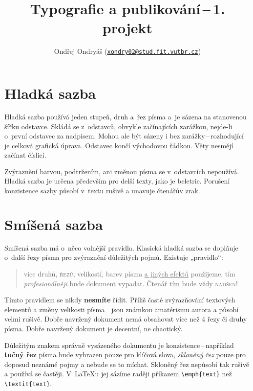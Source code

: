 \documentclass[twocolumn,10pt]{article}
\title{Typografie a publikování\,--\,1. projekt\vspace{.4em}}
\author{Ondřej Ondryáš (\href{mailto:xondry02@stud.fit.vutbr.cz}{\nolinkurl{xondry02@stud.fit.vutbr.cz}})}
\date{}
\begin{document}
\maketitle

\section{Hladká sazba}

Hladká sazba používá jeden stupeň, druh a~řez písma a~je sázena na stanovenou šířku odstavce. Skládá se z~odstavců, obvykle začínajících zarážkou, nejde-li o~první odstavec za nadpisem. Mohou ale být sázeny i bez zarážky\,--\,rozhodující je celková grafická úprava. Odstavec končí východovou řádkou. Věty nesmějí začínat číslicí.

Zvýraznění barvou, podtržením, ani změnou písma se v~odstavcích nepoužívá. Hladká sazba je určena především pro delší texty, jako je beletrie. Porušení konzistence sazby působí v~textu rušivě a unavuje čtenářův zrak.

\section{Smíšená sazba}

Smíšená sazba má o~něco volnější pravidla. Klasická hladká sazba se doplňuje o~další řezy písma pro zvýraznění důležitých pojmů. Existuje „pravidlo“:

\begin{quotation}
{ více druhů}, \textsc{řezů}, {\tiny velikostí}, barev písma \underline{a jiných efektů} použijeme, tím \emph{\large profesionálněji} bude dokument vypadat. Čtenář tím bude vždy \textsc{nadšen}!
\end{quotation}

{\footnotesize Tímto} pravidlem se nikdy \textbf{nesmíte} řídit. Příliš časté {\large zvýrazňování} textových elementů a změny velikosti {\huge písma}\ \ jsou známkou amatérismu autora a působí {\Huge velmi} rušivě. Dobře navržený dokument nemá obsahovat více než 4 řezy či druhy písma. Dobře navržený dokument je decentní, ne chaotický.

Důležitým znakem správně vysázeného dokumentu je konzistence\,--\,například \textbf{tučný řez} písma bude vyhrazen pouze pro klíčová slova, \emph{skloněný řez} pouze pro doposud neznámé pojmy a nebude se to míchat. Skloněný řez nepůsobí tak rušivě a používá se častěji. V~\LaTeX u jej sázíme raději příkazem \verb|\emph{text}| než \verb|\textit{text}|.
\end{document}
